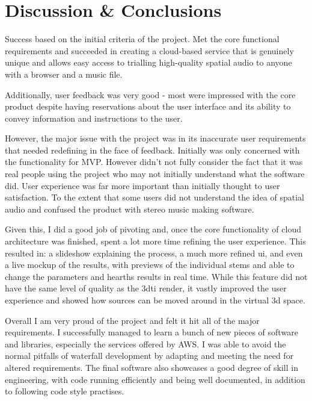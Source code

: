 \thispagestyle{plain}
\newpage
\section{Discussion \& Conclusions}\label{sec:discussion-conclusions}

\normalsize

Success based on the initial criteria of the project. Met the core functional requirements and succeeded in creating a cloud-based service that is genuinely unique and allows easy access to trialling high-quality spatial audio to anyone with a browser and a music file.

Additionally, user feedback was very good - most were impressed with the core product despite having reservations about the user interface and its ability to convey information and instructions to the user.

However, the major issue with the project was in its inaccurate user requirements that needed redefining in the face of feedback. Initially was only concerned with the functionality for MVP. However didn't not fully consider the fact that it was real people using the project who may not initially understand what the software did. User experience was far more important than initially thought to user satisfaction. To the extent that some users did not understand the idea of spatial audio and confused the product with stereo music making software.

Given this, I did a good job of pivoting and, once the core functionality of cloud architecture was finished, spent a lot more time refining the user experience. This resulted in: a slideshow explaining the process, a much more refined ui, and even a live mockup of the results, with previews of the individual stems and able to change the parameters and hearths results in real time. While this feature did not have the same level of quality as the 3dti render, it vastly improved the user experience and showed how sources can be moved around in the virtual 3d space.

Overall I am very proud of the project and felt it hit all of the major requirements. I successfully managed to learn a bunch of new pieces of software and libraries, especially the services offered by AWS. I was able to avoid the normal pitfalls of waterfall development by adapting and meeting the need for altered requirements. The final software also showcases a good degree of skill in engineering, with code running efficiently and being well documented, in addition to following code style practises.

